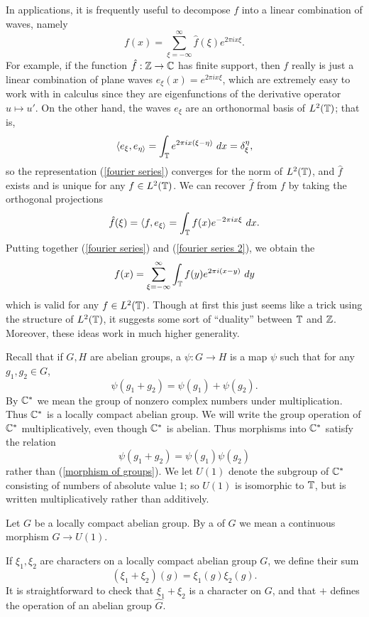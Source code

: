 In applications, it is frequently useful to decompose $f$ into a linear combination of waves, namely
\begin{equation}\label{fourier series}
f(x) = \sum_{\xi=-\infty}^{\infty} \hat{f}(\xi) e^{2\pi ix\xi}.
\end{equation}
For example, if the function $\hat{f}: \mathbb{Z} \to \mathbb{C}$ has finite support, then $f$ really is just a linear combination of plane waves $e_{\xi}(x) = e^{2\pi i x\xi}$, which are extremely easy to work with in calculus since they are eigenfunctions of the derivative operator $u \mapsto u'$.
On the other hand, the waves $e_{\xi}$ are an orthonormal basis of $L^{2}(\mathbb{T})$; that is,
\[\langle e_{\xi}, e_{\eta\rangle} = \int_{\mathbb{T}} e^{2\pi i x(\xi - \eta)} ~dx = \delta_{\xi}^{\eta},\]
so the representation (\ref{fourier series}) converges for the norm of $L^{2}(\mathbb{T})$, and $\hat{f}$ exists and is unique for any $f \in L^{2}(\mathbb{T})$.
We can recover $\hat{f}$ from $f$ by taking the orthogonal projections
\begin{equation}\label{fourier series 2}
\hat{f}(\xi) = \langle f, e_{\xi\rangle} = \int_{\mathbb{T}} f(x) e^{-2\pi ix\xi} ~dx.
\end{equation}
Putting together (\ref{fourier series}) and (\ref{fourier series 2}), we obtain the 
\begin{equation}\label{fourier series 3}
f(x) = \sum_{\xi = -\infty}^{\infty} \int_{\mathbb{T}} f(y) e^{2\pi i(x-y)}~dy
\end{equation}
which is valid for any $f \in L^{2}(\mathbb{T})$. Though at first this just seems like a trick using the structure of $L^{2}(\mathbb{T})$, it suggests some sort of ``duality'' between $\mathbb{T}$ and $\mathbb{Z}$.
Moreover, these ideas work in much higher generality.

Recall that if $G,H$ are abelian groups, a  $\psi: G \to H$ is a map $\psi$ such that for any $g_{1}, g_{2} \in G$,
\begin{equation}\label{morphism of groups}
\psi(g_{1} + g_{2}) = \psi(g_{1}) + \psi(g_{2}).
\end{equation}
By $\mathbb{C}^{*}$ we mean the group of nonzero complex numbers under multiplication. Thus $\mathbb{C}^{*}$ is a locally compact abelian group.
We will write the group operation of $\mathbb{C}^{*}$ multiplicatively, even though $\mathbb{C}^{*}$ is abelian. Thus morphisms into $\mathbb{C}^{*}$ satisfy the relation
\[\psi(g_{1} + g_{2}) = \psi(g_{1})\psi(g_{2})\]
rather than (\ref{morphism of groups}).
We let $U(1)$ denote the subgroup of $\mathbb{C}^{*}$ consisting of numbers of absolute value $1$; so $U(1)$ is isomorphic to $\mathbb{T}$, but is written multiplicatively rather than additively.
\begin{definition}
Let $G$ be a locally compact abelian group.
By a  of $G$ we mean a continuous morphism $G \to U(1)$.
\end{definition}
If $\xi_{1}, \xi_{2}$ are characters on a locally compact abelian group $G$, we define their sum
\[(\xi_{1} + \xi_{2})(g) = \xi_{1}(g)\xi_{2}(g).\]
It is straightforward to check that $\xi_{1} + \xi_{2}$ is a character on $G$, and that $+$ defines the operation of an abelian group $\hat{G}$.

